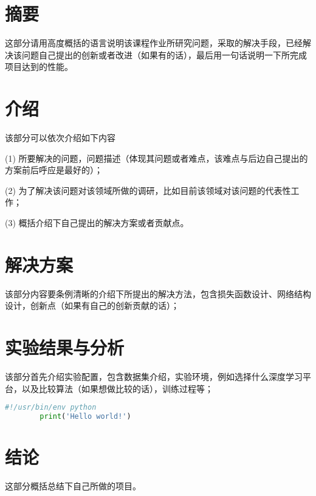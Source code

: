 \section*{摘要}
    这部分请用高度概括的语言说明该课程作业所研究问题，采取的解决手段，已经解决该问题自己提出的创新或者改进（如果有的话），最后用一句话说明一下所完成项目达到的性能。


\section{介绍}
    该部分可以依次介绍如下内容\cite{ShafieeFast}

    (1) 所要解决的问题，问题描述（体现其问题或者难点，该难点与后边自己提出的方案前后呼应是最好的）；

    (2) 为了解决该问题对该领域所做的调研，比如目前该领域对该问题的代表性工作；

    (3) 概括介绍下自己提出的解决方案或者贡献点。
    
\section{解决方案}
    该部分内容要条例清晰的介绍下所提出的解决方法，包含损失函数设计、网络结构设计，创新点（如果有自己的创新贡献的话）；


\section{实验结果与分析}
    该部分首先介绍实验配置，包含数据集介绍，实验环境，例如选择什么深度学习平台，以及比较算法（如果想做比较的话），训练过程等；

    
	\begin{lstlisting}[language=python] 
	    #!/usr/bin/env python
	    print('Hello world!')
	\end{lstlisting}


\section{结论}
    这部分概括总结下自己所做的项目。
    
    